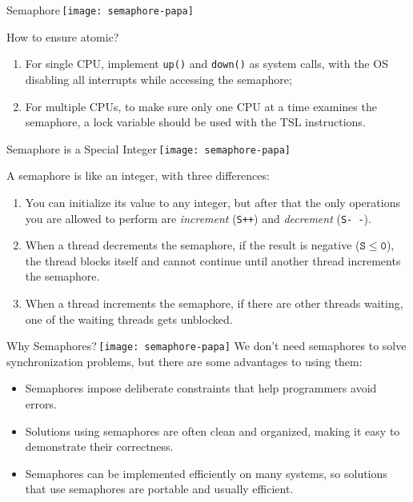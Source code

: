 \begin{frame}{Semaphore\,\texttt{[image: semaphore-papa]}}%
\begin{block}{How to ensure atomic?}
  \begin{enumerate}
  \item For single CPU, implement \texttt{up()} and \texttt{down()} as system calls, with the
    OS disabling all interrupts while accessing the semaphore;
  \item For multiple CPUs, to make sure only one CPU at a time examines the semaphore, a lock
    variable should be used with the TSL instructions.
  \end{enumerate}
\end{block}
\end{frame}

\begin{frame}{Semaphore is a Special Integer\,\texttt{[image: semaphore-papa]}}
  \begin{block}{A semaphore is like an integer, with three differences:}
    \begin{enumerate}
    \item You can initialize its value to any integer, but after that the only operations you are
      allowed to perform are \emph{increment} (\texttt{S++}) and \emph{decrement} (\texttt{S-\,-}).
    \item When a thread decrements the semaphore, if the result is negative
      ($\mathtt{S\le{}0}$), the thread blocks itself and cannot continue until another
      thread increments the semaphore.
    \item When a thread increments the semaphore, if there are other threads waiting, one of the
      waiting threads gets unblocked.
    \end{enumerate}
  \end{block}
\end{frame}

\begin{frame}{Why Semaphores?\,\texttt{[image: semaphore-papa]}}
  We don't need semaphores to solve synchronization problems, but there are some advantages to using
  them:
  \begin{itemize}
  \item Semaphores impose deliberate constraints that help programmers avoid errors.
  \item Solutions using semaphores are often clean and organized, making it easy to demonstrate
    their correctness.
  \item Semaphores can be implemented efficiently on many systems, so solutions that use semaphores
    are portable and usually efficient.
  \end{itemize}
\end{frame}

